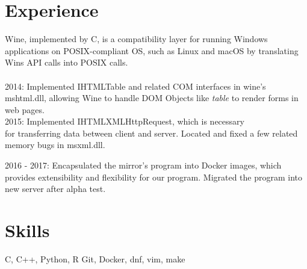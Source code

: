 

\section{Experience}

{
	{Wine, implemented by C, is a compatibility layer for running Windows applications on %
	POSIX-compliant OS, such as Linux and macOS by translating Wins API %
	calls into POSIX calls.\\ \\}
	{2014: Implemented IHTMLTable and related COM interfaces in wine's mshtml.dll, allowing Wine to handle DOM Objects like \textit{table} to render forms in web pages.}\\
	{2015: Implemented IHTMLXMLHttpRequest, which is necessary \\
	for transferring data between client and server. Located and fixed a few related memory bugs in msxml.dll.}
}





{
2016 - 2017: 
Encapsulated the mirror's program into Docker images, which provides extensibility
and flexibility for our program. Migrated the program into new server after alpha test.
}

\vspace{-5mm}

\section{Skills}
{ C, C++, Python, R
	}
{Git, Docker, dnf, vim, make
	}
%




